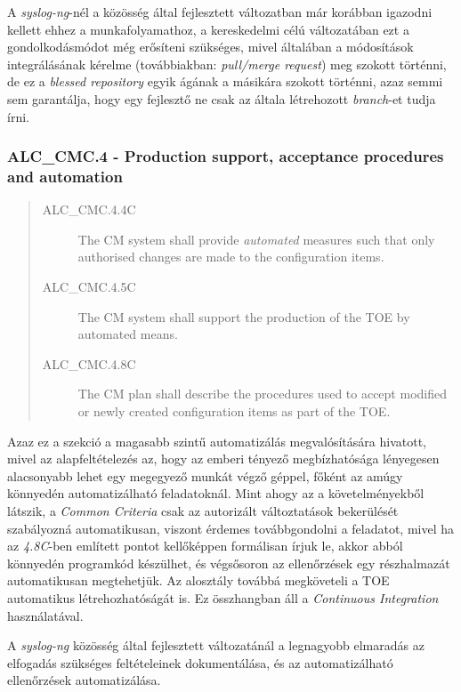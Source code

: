 A \emph{syslog-ng}-nél a közösség által fejlesztett változatban már korábban igazodni kellett ehhez
a munkafolyamathoz, a kereskedelmi célú változatában ezt a gondolkodásmódot még erősíteni szükséges,
mivel általában a módosítások integrálásának kérelme (továbbiakban: \emph{pull/merge request}) meg
szokott történni, de ez a \emph{blessed repository} egyik ágának a másikára szokott történni, azaz
semmi sem garantálja, hogy egy fejlesztő ne csak az általa létrehozott \emph{branch}-et tudja írni.

\pagebreak[1]
\subsubsection{ALC\_CMC.4 - Production support, acceptance procedures and automation }
\begin{quote}
    \begin{description}
        \item[ALC\_CMC.4.4C]{The CM system shall provide \emph{automated} measures such that only
            authorised changes are made to the configuration items.}
        \item[ALC\_CMC.4.5C]{The CM system shall support the production of the TOE by automated
            means.}
        \item[ALC\_CMC.4.8C]{The CM plan shall describe the procedures used to accept modified or
            newly created configuration items as part of the TOE.}
    \end{description}
\end{quote}

Azaz ez a szekció a magasabb szintű automatizálás megvalósítására hivatott, mivel az
alapfeltételezés az, hogy az emberi tényező megbízhatósága lényegesen alacsonyabb lehet egy
megegyező munkát végző géppel, főként az amúgy könnyedén automatizálható feladatoknál.  Mint ahogy
az a követelményekből látszik, a \emph{Common Criteria} csak az autorizált változtatások bekerülését
szabályozná automatikusan, viszont érdemes továbbgondolni a feladatot, mivel ha az \emph{4.8C}-ben
említett pontot kellőképpen formálisan írjuk le, akkor abból könnyedén programkód készülhet, és
végsősoron az ellenőrzések egy részhalmazát automatikusan megtehetjük.  Az alosztály továbbá
megköveteli a TOE automatikus létrehozhatóságát is. Ez összhangban áll a \emph{Continuous
Integration}\cite{fowler2006continuous} használatával.

A \emph{syslog-ng} közösség által fejlesztett változatánál a legnagyobb elmaradás az elfogadás
szükséges feltételeinek dokumentálása, és az automatizálható ellenőrzések automatizálása.

